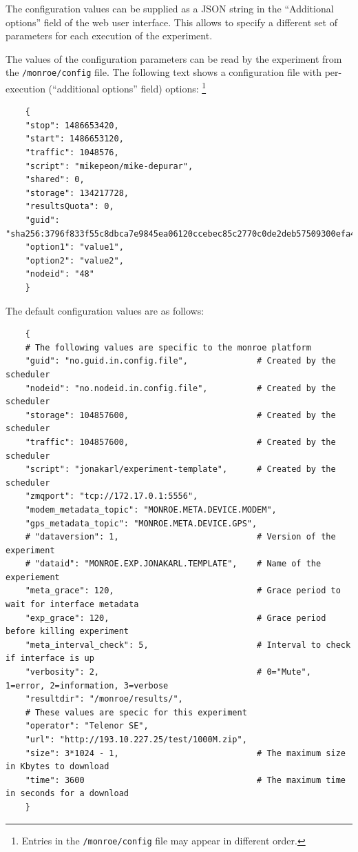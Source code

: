 \documentclass[a4paper,10pt]{article}
\newcommand{\VerbatimFont}{\footnotesize}
\newcommand{\identifier}[1]{{\texttt{\small{#1}}}}
\begin{document}
The configuration values can be supplied as a JSON string in the ``Additional options'' field of the web user interface.
This allows to specify a different set of parameters for each execution of the experiment.

The values of the configuration parameters can be read by the experiment from the \identifier{/monroe/config} file.
The following text shows a configuration file with %
per-execution (``additional options'' field) options:%
\footnote{Entries in the \identifier{/monroe/config} file may appear in different order.}

{\VerbatimFont
	\begin{verbatim}
	{
	"stop": 1486653420, 
	"start": 1486653120,
	"traffic": 1048576,
	"script": "mikepeon/mike-depurar",
	"shared": 0,
	"storage": 134217728,
	"resultsQuota": 0,
	"guid": "sha256:3796f833f55c8dbca7e9845ea06120ccebec85c2770c0de2deb57509300efa44.165695.48.1",
	"option1": "value1",
	"option2": "value2",
	"nodeid": "48"
	}
	\end{verbatim}}

The default configuration values are as follows:

{\VerbatimFont
	\begin{verbatim}
	{
	# The following values are specific to the monroe platform
	"guid": "no.guid.in.config.file",              # Created by the scheduler
	"nodeid": "no.nodeid.in.config.file",          # Created by the scheduler
	"storage": 104857600,                          # Created by the scheduler
	"traffic": 104857600,                          # Created by the scheduler
	"script": "jonakarl/experiment-template",      # Created by the scheduler
	"zmqport": "tcp://172.17.0.1:5556",
	"modem_metadata_topic": "MONROE.META.DEVICE.MODEM",
	"gps_metadata_topic": "MONROE.META.DEVICE.GPS",
	# "dataversion": 1,                            # Version of the experiment
	# "dataid": "MONROE.EXP.JONAKARL.TEMPLATE",    # Name of the experiement
	"meta_grace": 120,                             # Grace period to wait for interface metadata
	"exp_grace": 120,                              # Grace period before killing experiment
	"meta_interval_check": 5,                      # Interval to check if interface is up
	"verbosity": 2,                                # 0="Mute", 1=error, 2=information, 3=verbose
	"resultdir": "/monroe/results/",
	# These values are specic for this experiment
	"operator": "Telenor SE",
	"url": "http://193.10.227.25/test/1000M.zip",
	"size": 3*1024 - 1,                            # The maximum size in Kbytes to download
	"time": 3600                                   # The maximum time in seconds for a download
	}
	\end{verbatim}}
\end{document}
